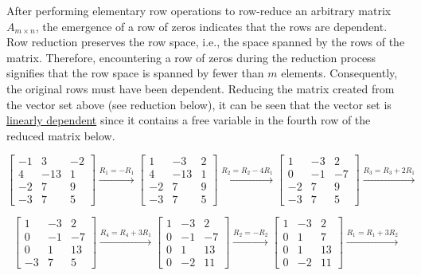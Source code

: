 \documentclass[letter,11pt]{article}
\begin{document}
\begin{tcolorbox}[boxrule=1mm, width=(.9\linewidth),before=\hfill,after=\hfill,adjusted title={Problem \# 3 Solutions}]
After performing elementary row operations to row-reduce an arbitrary matrix $A_{m \times n}$, the emergence of a row of zeros indicates that the rows are dependent. Row reduction preserves the row space, i.e., the space spanned by the rows of the matrix. Therefore, encountering a row of zeros during the reduction process signifies that the row space is spanned by fewer than $m$ elements. Consequently, the original rows must have been dependent. Reducing the matrix created from the vector set above (see reduction below), it can be seen that the vector set is \underline{linearly dependent} since it contains a free variable in the fourth row of the reduced matrix below.

\tcblower 
$$\begin{bmatrix}
-1 & 3 & -2 \\
4 & -13 & 1\\
-2 & 7 & 9\\
-3 & 7 & 5
\end{bmatrix} \xrightarrow{R_1 = -R_1}
\begin{bmatrix}
1 & -3 & 2 \\
4 & -13 & 1\\
-2 & 7 & 9\\
-3 & 7 & 5
\end{bmatrix}\xrightarrow{R_2 = R_2 -4R_1}
\begin{bmatrix}
1 & -3 & 2 \\
0 & -1 & -7\\
-2 & 7 & 9\\
-3 & 7 & 5
\end{bmatrix}\xrightarrow{R_3 = R_3 +2R_1}$$

$$\begin{bmatrix}
1 & -3 & 2 \\
0 & -1 & -7\\
0 & 1 & 13\\
-3 & 7 & 5
\end{bmatrix} \xrightarrow{R_4=R_4+3R_1}
\begin{bmatrix}
1 & -3 & 2 \\
0 & -1 & -7\\
0 & 1 & 13\\
0 & -2 & 11
\end{bmatrix}\xrightarrow{R_2 = -R_2}
\begin{bmatrix}
1 & -3 & 2 \\
0 & 1 & 7\\
0 & 1 & 13\\
0 & -2 & 11
\end{bmatrix}\xrightarrow{R_1 = R_1 +3 R_2}$$


\end{tcolorbox}
\end{document}
